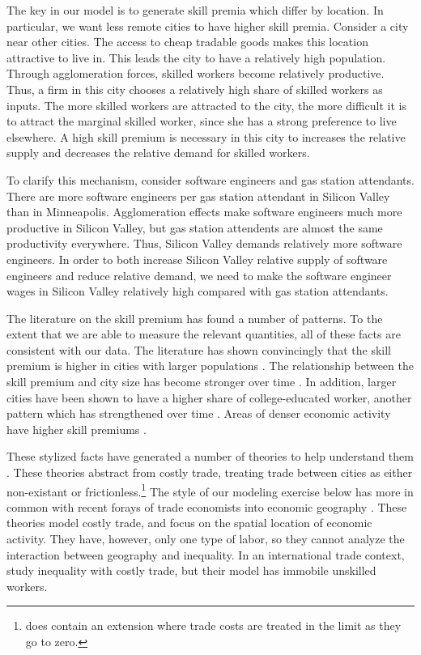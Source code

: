 \documentclass{article}
\begin{document}
The key in our model is to generate skill premia which differ by location.  In particular, we want less remote cities to have higher skill premia.  Consider a city near other cities.  The access to cheap tradable goods makes this location attractive to live in.  This leads the city to have a relatively high population.  Through agglomeration forces, skilled workers become relatively productive.  Thus, a firm in this city chooses a relatively high share of skilled workers as inputs.  The more skilled workers are attracted to the city, the more difficult it is to attract the marginal skilled worker, since she has a strong preference to live elsewhere.  A high skill premium is necessary in this city to increases the relative supply and decreases the relative demand for skilled workers.

To clarify this mechanism, consider software engineers and gas station attendants.  There are more software engineers per gas station attendant in Silicon Valley than in Minneapolis.  Agglomeration effects make software engineers much more productive in Silicon Valley, but gas station attendents are almost the same productivity everywhere.  Thus, Silicon Valley demands relatively more software engineers.  In order to both increase Silicon Valley relative supply of software engineers and reduce relative demand, we need to make the software engineer wages in Silicon Valley relatively high compared with gas station attendants.

The literature on the skill premium has found a number of patterns.  To the extent that we are able to measure the relevant quantities, all of these facts are consistent with our data.  The literature has shown convincingly that the skill premium is higher in cities with larger populations \citep{davis2012spatial}.  The relationship between the skill premium and city size has become stronger over time \citep{baum2013inequality, lindley2014spatial}.  In addition, larger cities have been shown to have a higher share of college-educated worker, another pattern which has strengthened over time \citep{moretti2008real, lindley2014spatial}.  Areas of denser economic activity have higher skill premiums \citep{combes2012sorting}.

These stylized facts have generated a number of theories to help understand them \citep{davis2012spatial,davis2014comparative,baum2012understanding,combes2012sorting}.  These theories abstract from costly trade, treating trade between cities as either non-existant or frictionless.\footnote{\citet{davis2012spatial} does contain an extension where trade costs are treated in the limit as they go to zero.}  The style of our modeling exercise below has more in common with recent forays of trade economists into economic geography \citep{allen2014trade,desmet2014geography}.  These theories model costly trade, and focus on the spatial location of economic activity. They have, however, only one type of labor, so they cannot analyze the interaction between geography and inequality.  In an international trade context, \citet{fujita2006globalization} study inequality with costly trade, but their model has immobile unskilled workers.
\end{document}
